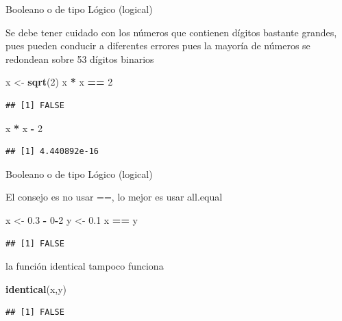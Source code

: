 \documentclass[ignorenonframetext,]{beamer}
\newenvironment{Shaded}{\begin{snugshade}}{\end{snugshade}}
\newcommand{\KeywordTok}[1]{\textcolor[rgb]{0.13,0.29,0.53}{\textbf{#1}}}
\newcommand{\DecValTok}[1]{\textcolor[rgb]{0.00,0.00,0.81}{#1}}
\newcommand{\FloatTok}[1]{\textcolor[rgb]{0.00,0.00,0.81}{#1}}
\newcommand{\StringTok}[1]{\textcolor[rgb]{0.31,0.60,0.02}{#1}}
\newcommand{\OperatorTok}[1]{\textcolor[rgb]{0.81,0.36,0.00}{\textbf{#1}}}
\newcommand{\NormalTok}[1]{#1}
\begin{document}
\begin{frame}[fragile]{Booleano o de tipo Lógico (logical)}

Se debe tener cuidado con los números que contienen dígitos bastante
grandes, pues pueden conducir a diferentes errores pues la mayoría de
números se redondean sobre 53 dígitos binarios

\begin{Shaded}
\begin{Highlighting}[]
\NormalTok{x <-}\StringTok{ }\KeywordTok{sqrt}\NormalTok{(}\DecValTok{2}\NormalTok{)}
\NormalTok{x }\OperatorTok{*}\StringTok{ }\NormalTok{x }\OperatorTok{==}\StringTok{ }\DecValTok{2}
\end{Highlighting}
\end{Shaded}

\begin{verbatim}
## [1] FALSE
\end{verbatim}

\begin{Shaded}
\begin{Highlighting}[]
\NormalTok{x }\OperatorTok{*}\StringTok{ }\NormalTok{x }\OperatorTok{-}\StringTok{ }\DecValTok{2}
\end{Highlighting}
\end{Shaded}

\begin{verbatim}
## [1] 4.440892e-16
\end{verbatim}

\end{frame}

\begin{frame}[fragile]{Booleano o de tipo Lógico (logical)}

El consejo es no usar ==, lo mejor es usar all.equal

\begin{Shaded}
\begin{Highlighting}[]
\NormalTok{x <-}\StringTok{ }\FloatTok{0.3} \OperatorTok{-}\StringTok{ }\DecValTok{0}\OperatorTok{-}\DecValTok{2}
\NormalTok{y <-}\StringTok{ }\FloatTok{0.1}
\NormalTok{x }\OperatorTok{==}\StringTok{ }\NormalTok{y}
\end{Highlighting}
\end{Shaded}

\begin{verbatim}
## [1] FALSE
\end{verbatim}

la función identical tampoco funciona

\begin{Shaded}
\begin{Highlighting}[]
\KeywordTok{identical}\NormalTok{(x,y)}
\end{Highlighting}
\end{Shaded}

\begin{verbatim}
## [1] FALSE
\end{verbatim}

\end{frame}
\end{document}
